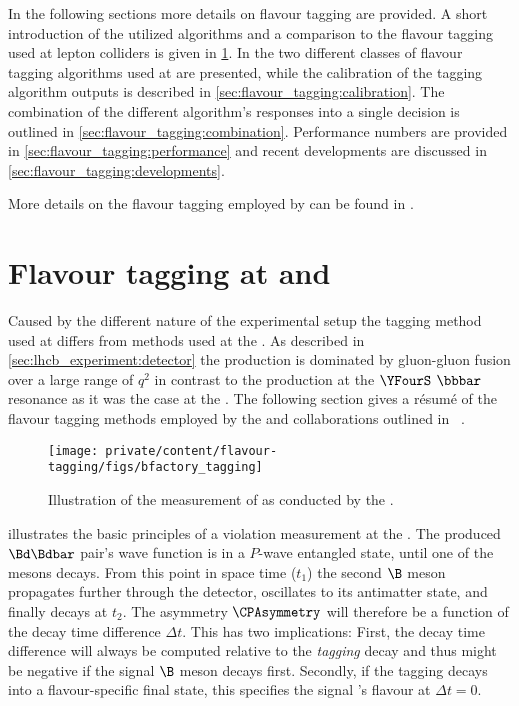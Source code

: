 In the following sections more details on flavour tagging are provided. A short
introduction of the utilized algorithms and a comparison to the flavour tagging
used at lepton colliders is given in \cref{sec:flavour_tagging:b_factories}. In
 the two different classes of flavour tagging
algorithms used at \LHCb are presented, while the calibration of the tagging
algorithm outputs is described in
\cref{sec:flavour_tagging:calibration}. The combination of the different
algorithm's responses into a single decision is outlined in
\cref{sec:flavour_tagging:combination}. Performance numbers are provided in
\cref{sec:flavour_tagging:performance} and recent developments are discussed in
\cref{sec:flavour_tagging:developments}.

More details on the flavour tagging employed by \LHCb can be found in
\cite{Aaij:2012mu,FT:RunI}.

\section{Flavour tagging at \Babar and \Belle}
\label{sec:flavour_tagging:b_factories}

Caused by the different nature of the experimental setup the tagging method used
at \LHCb differs from methods used at the \BFactories. As described in
\cref{sec:lhcb_experiment:detector} the \bhadron production is dominated
by gluon-gluon fusion over a large range of $q^2$ in contrast to the production
at the $\YFourS$ $\bbbar$ resonance as it was the case at the \BFactories. The
following section gives a résumé of the flavour tagging methods employed by the
\Babar and \Belle collaborations outlined in \Ref~\cite[][Ch. 8]{Bevan:2014iga}.
%
\begin{figure}[h]
\centering
\texttt{[image: private/content/flavour-tagging/figs/bfactory\_tagging]}
\caption{Illustration of the measurement of \sintwobeta as conducted by the \BFactories.
}
\label{fig:flavour_tagging:lhcb:b_factory_basic_principles}
\end{figure}

 illustrates the basic
principles of a \CP violation measurement at the \BFactories. The produced
$\Bd\Bdbar$ pair's wave function is in a $P$-wave entangled state, until one of
the mesons decays. From this point in space time ($t_1$) the second $\B$ meson
propagates further through the detector, oscillates to its antimatter state, and
finally decays at $t_2$. The \CP asymmetry $\CPAsymmetry$ will therefore be a
function of the decay time difference $\Delta t$. This has two implications:
First, the decay time difference will always be computed relative to the
\emph{tagging} \Bmeson decay and thus might be negative if the signal $\B$
meson decays first. Secondly, if the tagging \Bmeson decays into a
flavour-specific final state, this specifies the signal \Bmeson's flavour at
$\Delta t=0$.

